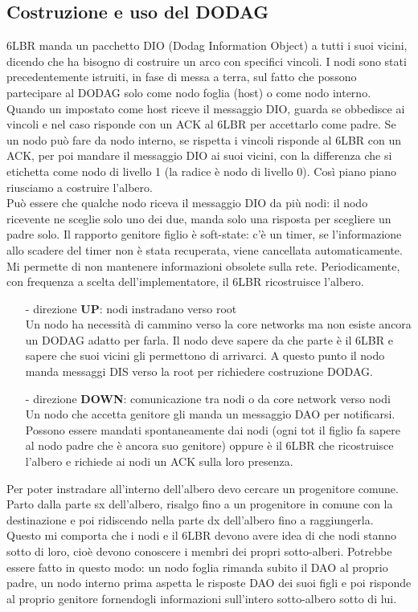 \documentclass[12pt,italian]{report}
\begin{document}
\subsection{Costruzione e uso del DODAG}
6LBR manda un pacchetto DIO (Dodag Information Object) a tutti i suoi vicini, dicendo che ha bisogno di costruire un arco con specifici vincoli. I nodi sono stati precedentemente istruiti, in fase di messa a terra, sul fatto che possono partecipare al DODAG solo come nodo foglia (host) o come nodo interno. Quando un impostato come host riceve il messaggio DIO, guarda se obbedisce ai vincoli e nel caso risponde con un ACK al 6LBR per accettarlo come padre. Se un nodo può fare da nodo interno, se rispetta i vincoli risponde al 6LBR con un ACK, per poi mandare il messaggio DIO ai suoi vicini, con la differenza che si etichetta come nodo di livello 1 (la radice è nodo di livello 0). Così piano piano riusciamo a costruire l'albero. \\
Può essere che qualche nodo riceva il messaggio DIO da più nodi: il nodo ricevente ne sceglie solo uno dei due, manda solo una risposta per scegliere un padre solo.
\bigbreak
Il rapporto genitore figlio è soft-state: c'è un timer, se l'informazione allo scadere del timer non è stata recuperata, viene cancellata automaticamente. Mi permette di non mantenere informazioni obsolete sulla rete.
\bigbreak
Periodicamente, con frequenza a scelta dell'implementatore, il 6LBR ricostruisce l'albero.
\begin{itemize}
    \item [-] direzione \textbf{UP}: nodi instradano verso root \\
    Un nodo ha necessità di cammino verso la core networks ma non esiste ancora un DODAG adatto per farla. Il nodo deve sapere da che parte è il 6LBR e sapere che suoi vicini gli permettono di arrivarci. A questo punto il nodo manda messaggi DIS verso la root per richiedere costruzione DODAG.
    \item [-] direzione \textbf{DOWN}: comunicazione tra nodi o da core network verso nodi \\
    Un nodo che accetta genitore gli manda un messaggio DAO per notificarsi. \\ Possono essere mandati spontaneamente dai nodi (ogni tot il figlio fa sapere al nodo padre che è ancora suo genitore) oppure è il 6LBR che ricostruisce l'albero e richiede ai nodi un ACK sulla loro presenza. 
\end{itemize}

Per poter instradare all'interno dell'albero devo cercare un progenitore comune. Parto dalla parte sx dell'albero, risalgo fino a un progenitore in comune con la destinazione e poi ridiscendo nella parte dx dell'albero fino a raggiungerla. Questo mi comporta che i nodi e il 6LBR devono avere idea di che nodi stanno sotto di loro, cioè devono conoscere i membri dei propri sotto-alberi. Potrebbe essere fatto in questo modo: un nodo foglia rimanda subito il DAO al proprio padre, un nodo interno prima aspetta le risposte DAO dei suoi figli e poi risponde al proprio genitore fornendogli informazioni sull'intero sotto-albero sotto di lui. 
\end{document}
